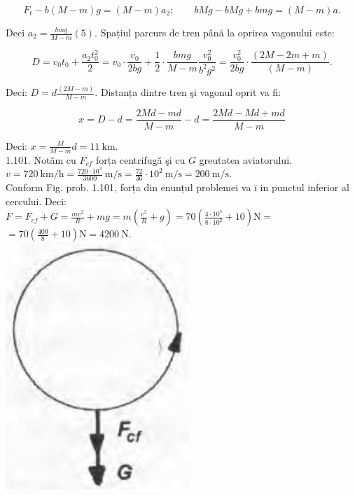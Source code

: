 \documentclass[10pt]{article}
\begin{document}
$$
F_{t}-b(M-m) g=(M-m) a_{2} ; \quad \quad b M g-b M g+b m g=(M-m) a .
$$

Deci $a_{2}=\frac{b m g}{M-m}(5)$. Spațiul parcurs de tren până la oprirea vagonului este:

$$
D=v_{0} t_{0}+\frac{a_{2} t_{0}^{2}}{2}=v_{0} \cdot \frac{v_{0}}{2 b g}+\frac{1}{2} \cdot \frac{b m g}{M-m} \frac{v_{0}^{2}}{b^{2} g^{2}}=\frac{v_{0}^{2}}{2 b g} \cdot \frac{(2 M-2 m+m)}{(M-m)} .
$$

Deci: $D=d \frac{(2 M-m)}{M-m}$. Distanța dintre tren şi vagonul oprit va fi:

$$
x=D-d=\frac{2 M d-m d}{M-m}-d=\frac{2 M d-M d+m d}{M-m}
$$

Deci: $x=\frac{M}{M-m} d=11 \mathrm{~km}$.\\
1.101. Notăm cu $F_{c f}$ forța centrifugă şi cu $G$ greutatea aviatorului.\\
$v=720 \mathrm{~km} / \mathrm{h}=\frac{720 \cdot 10^{3}}{3600} \mathrm{~m} / \mathrm{s}=\frac{72}{36} \cdot 10^{2} \mathrm{~m} / \mathrm{s}=200 \mathrm{~m} / \mathrm{s}$.\\
Conform Fig. prob. 1.101, forța din enunțul problemei va ī in punctul inferior al cercului. Deci:\\
$F=F_{c f}+G=\frac{m v^{2}}{R}+m g=m\left(\frac{v^{2}}{R}+g\right)=70\left(\frac{4 \cdot 10^{4}}{8 \cdot 10^{2}}+10\right) \mathrm{N}=$ $=70\left(\frac{400}{8}+10\right) \mathrm{N}=4200 \mathrm{~N}$.\\
\includegraphics[max width=\textwidth, center]{2025_07_01_5b3ff9fa0d508c8e9f17g-219}
\end{document}
